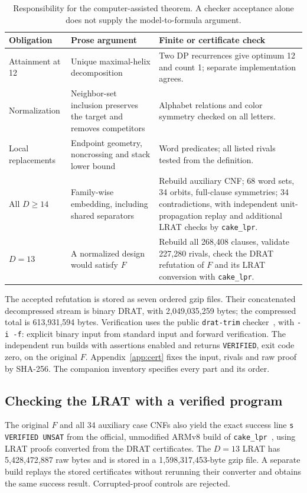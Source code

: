 \documentclass[11pt,a4paper]{article}
\theoremstyle{definition}
\begin{document}
\begin{table}[ht]
\centering\small
\begin{tabularx}{\linewidth}{@{}>{\raggedright\arraybackslash}p{28mm}YY@{}}
\toprule
Obligation & Prose argument & Finite or certificate check\\
\midrule
Attainment at 12 & Unique maximal-helix decomposition & Two DP
recurrences give optimum 12 and count 1; separate implementation agrees.\\
Normalization & Neighbor-set inclusion preserves the target and removes
competitors & Alphabet relations and color symmetry checked on all letters.\\
Local replacements & Endpoint geometry, noncrossing and stack lower
bound & Word predicates; all listed rivals tested from the definition.\\
All $D\geq14$ & Family-wise embedding, including shared separators &
Rebuild auxiliary CNF; 68 word sets, 34 orbits, full-clause symmetries;
34 contradictions, with independent unit-propagation replay and
additional LRAT checks by \texttt{cake\_lpr}.\\
$D=13$ & A normalized design would satisfy $F$ & Rebuild all 268,408
clauses, validate 227,280 rivals, check the DRAT refutation of $F$
and its LRAT conversion with \texttt{cake\_lpr}.\\
\bottomrule
\end{tabularx}
\caption{Responsibility for the computer-assisted theorem. A checker
acceptance alone does not supply the model-to-formula argument.}
\label{tab:obligations}
\end{table}

The accepted refutation is stored as seven ordered gzip files. Their
concatenated decompressed stream is binary DRAT, with
2,049,035,259 bytes; the compressed total is 613,931,594 bytes.
Verification uses the public \texttt{drat-trim} checker~\cite{DRAT},
with \texttt{-i -f}: explicit binary input from standard input and
forward verification. The independent run builds with assertions
enabled and returns \texttt{VERIFIED}, exit code zero, on the original
$F$. Appendix~\ref{app:cert} fixes the input, rivals and raw proof by
SHA-256. The companion inventory specifies every part and its order.

\subsection{Checking the LRAT with a verified program}
The original $F$ and all 34 auxiliary case CNFs also yield the exact
success line \texttt{s VERIFIED UNSAT} from the official, unmodified
ARMv8 build of \texttt{cake\_lpr}~\cite{CAKE}, using LRAT proofs converted
from the DRAT certificates. The $D=13$ LRAT has 5,428,472,887 raw bytes
and is stored in a 1,598,317,453-byte gzip file. A separate build replays
the stored certificates without rerunning their converter and obtains
the same success result. Corrupted-proof controls are rejected.
\end{document}
